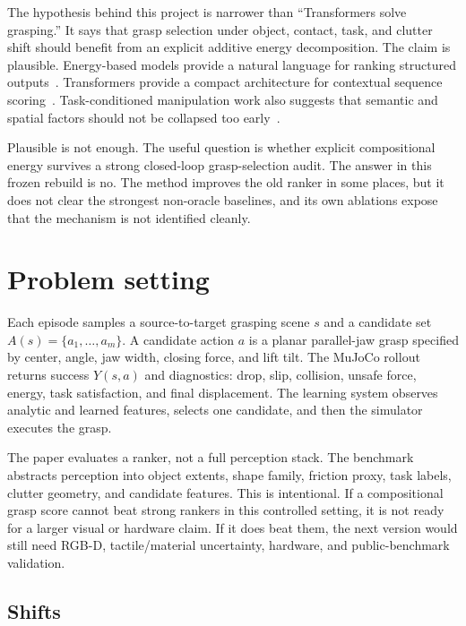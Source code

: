 \documentclass{article}
\begin{document}
The hypothesis behind this project is narrower than ``Transformers solve grasping.''
It says that grasp selection under object, contact, task, and clutter shift should benefit from an explicit additive energy decomposition.
The claim is plausible.
Energy-based models provide a natural language for ranking structured outputs~\citep{lecun2006tutorial,grathwohl2020jem}.
Transformers provide a compact architecture for contextual sequence scoring~\citep{vaswani2017attention}.
Task-conditioned manipulation work also suggests that semantic and spatial factors should not be collapsed too early~\citep{detry2017task,zeng2021transporter,shridhar2022cliport}.

Plausible is not enough.
The useful question is whether explicit compositional energy survives a strong closed-loop grasp-selection audit.
The answer in this frozen rebuild is no.
The method improves the old ranker in some places, but it does not clear the strongest non-oracle baselines, and its own ablations expose that the mechanism is not identified cleanly.

\section{Problem setting}

Each episode samples a source-to-target grasping scene $s$ and a candidate set $A(s)=\{a_1,\ldots,a_m\}$.
A candidate action $a$ is a planar parallel-jaw grasp specified by center, angle, jaw width, closing force, and lift tilt.
The MuJoCo rollout returns success $Y(s,a)$ and diagnostics:
drop, slip, collision, unsafe force, energy, task satisfaction, and final displacement.
The learning system observes analytic and learned features, selects one candidate, and then the simulator executes the grasp.

The paper evaluates a ranker, not a full perception stack.
The benchmark abstracts perception into object extents, shape family, friction proxy, task labels, clutter geometry, and candidate features.
This is intentional.
If a compositional grasp score cannot beat strong rankers in this controlled setting, it is not ready for a larger visual or hardware claim.
If it does beat them, the next version would still need RGB-D, tactile/material uncertainty, hardware, and public-benchmark validation.

\subsection{Shifts}
\end{document}
